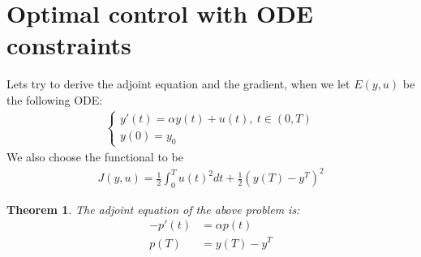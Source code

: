 \documentclass[11pt,a4paper]{article}
\newtheorem{theorem}{Theorem}
\begin{document}
\section{Optimal control with ODE constraints}
Lets try to derive the adjoint equation and the gradient, when we let $E(y,u)$ be the following ODE:
\begin{align*}
\left\{
     \begin{array}{lr}
       	y'(t)=\alpha y(t) +u(t), \ t \in (0,T)\\
       	   y(0)=y_0
     \end{array}
   \right.
\end{align*}
We also choose the functional to be
\begin{align*}
J(y,u) = \frac{1}{2}\int_0^Tu(t)^2dt + \frac{1}{2}(y(T)-y^T)^2
\end{align*}
\begin{theorem}
The adjoint equation of the above problem is:
\begin{align*}     
-p'(t) &= \alpha p(t) \\
p(T) &= y(T)-y^T     
\end{align*}
\end{theorem}
\end{document}
